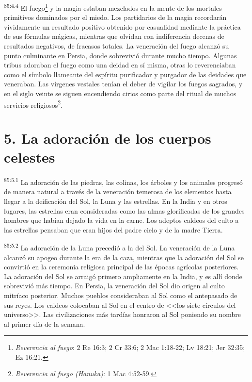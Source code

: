 \par
\textsuperscript{85:4.4} El fuego\footnote{\textit{Reverencia al fuego}: 2 Re 16:3; 2 Cr 33:6; 2 Mac 1:18-22; Lv 18:21; Jer 32:35; Ez 16:21.} y la magia estaban mezclados en la mente de los mortales primitivos dominados por el miedo. Los partidarios de la magia recordarán vívidamente un resultado positivo obtenido por casualidad mediante la práctica de sus fórmulas mágicas, mientras que olvidan con indiferencia decenas de resultados negativos, de fracasos totales. La veneración del fuego alcanzó su punto culminante en Persia, donde sobrevivió durante mucho tiempo. Algunas tribus adoraban el fuego como una deidad en sí misma, otras lo reverenciaban como el símbolo llameante del espíritu purificador y purgador de las deidades que veneraban. Las vírgenes vestales tenían el deber de vigilar los fuegos sagrados, y en el siglo veinte se siguen encendiendo cirios como parte del ritual de muchos servicios religiosos\footnote{\textit{Reverencia al fuego (Hanuka)}: 1 Mac 4:52-59.}.

\section*{5. La adoración de los cuerpos celestes}
\par
\textsuperscript{85:5.1} La adoración de las piedras, las colinas, los árboles y los animales progresó de manera natural a través de la veneración temerosa de los elementos hasta llegar a la deificación del Sol, la Luna y las estrellas. En la India y en otros lugares, las estrellas eran consideradas como las almas glorificadas de los grandes hombres que habían dejado la vida en la carne. Los adeptos caldeos del culto a las estrellas pensaban que eran hijos del padre cielo y de la madre Tierra.

\par
\textsuperscript{85:5.2} La adoración de la Luna precedió a la del Sol. La veneración de la Luna alcanzó su apogeo durante la era de la caza, mientras que la adoración del Sol se convirtió en la ceremonia religiosa principal de las épocas agrícolas posteriores. La adoración del Sol se arraigó primero ampliamente en la India, y es allí donde sobrevivió más tiempo. En Persia, la veneración del Sol dio origen al culto mitríaco posterior. Muchos pueblos consideraban al Sol como el antepasado de sus reyes. Los caldeos colocaban al Sol en el centro de <<los siete círculos del universo>>. Las civilizaciones más tardías honraron al Sol poniendo su nombre al primer día de la semana.

